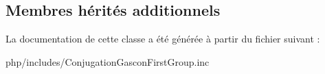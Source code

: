 \subsection*{Membres hérités additionnels}


La documentation de cette classe a été générée à partir du fichier suivant \+:\begin{DoxyCompactItemize}
\item 
php/includes/Conjugation\+Gascon\+First\+Group.\+inc\end{DoxyCompactItemize}
